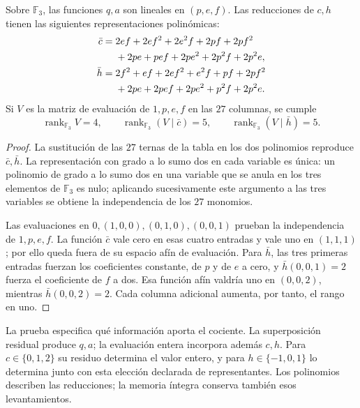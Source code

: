 \begin{theorem}
\label{carry27:rango}
Sobre \(\mathbb F_3\), las funciones \(q,a\) son lineales en
\((p,e,f)\). Las reducciones de \(c,h\) tienen las siguientes
representaciones polinómicas:
\begin{align}
\bar c={}&2ef+2ef^2+2e^2f+2pf+2pf^2\notag\\
 &+2pe+pef+2pe^2+2p^2f+2p^2e,
\label{carry27:polinomio-c}\\
\bar h={}&2f^2+ef+2ef^2+e^2f+pf+2pf^2\notag\\
 &+2pe+2pef+2pe^2+p^2f+2p^2e.
\label{carry27:polinomio-h}
\end{align}
Si \(V\) es la matriz de evaluación de \(1,p,e,f\) en las
\(27\) columnas, se cumple
\[
\operatorname{rank}_{\mathbb F_3}V=4,\qquad
\operatorname{rank}_{\mathbb F_3}(V\mid\bar c)=5,\qquad
\operatorname{rank}_{\mathbb F_3}(V\mid\bar h)=5.
\]
\end{theorem}

\begin{proof}
La sustitución de las \(27\) ternas de la tabla en los dos
polinomios reproduce \(\bar c,\bar h\). La representación con
grado a lo sumo dos en cada variable es única: un polinomio de
grado a lo sumo dos en una variable que se anula en los tres
elementos de \(\mathbb F_3\) es nulo; aplicando sucesivamente
este argumento a las tres variables se obtiene la independencia
de los \(27\) monomios.

Las evaluaciones en \(0,(1,0,0),(0,1,0),(0,0,1)\) prueban
la independencia de \(1,p,e,f\). La función \(\bar c\) vale
cero en esas cuatro entradas y vale uno en \((1,1,1)\);
por ello queda fuera de su espacio afín de evaluación.
Para \(\bar h\), las tres primeras entradas fuerzan los
coeficientes constante, de \(p\) y de \(e\) a cero, y
\(\bar h(0,0,1)=2\) fuerza el coeficiente de \(f\) a dos.
Esa función afín valdría uno en \((0,0,2)\), mientras
\(\bar h(0,0,2)=2\). Cada columna adicional aumenta,
por tanto, el rango en uno.
\end{proof}

La prueba especifica qué información aporta el cociente. La
superposición residual produce \(q,a\); la evaluación entera
incorpora además \(c,h\). Para \(c\in\{0,1,2\}\) su residuo
determina el valor entero, y para \(h\in\{-1,0,1\}\) lo
determina junto con esta elección declarada de representantes.
Los polinomios describen las reducciones; la memoria íntegra
conserva también esos levantamientos.

